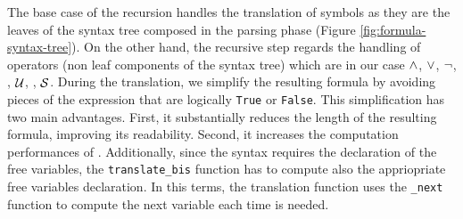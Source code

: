 The base case of the recursion handles the translation of symbols as they are the leaves of the syntax tree composed in the parsing phase (Figure \ref{fig:formula-syntax-tree}). On the other hand, the recursive step regards the handling of operators (non leaf components of the syntax tree) which are in our case $\wedge$, $\vee$, $\lnot$, \Next, $\mathop{\mathcal{U}}$, \Yesterday, $\mathop{\mathcal{S}}$. During the translation, we simplify the resulting formula by avoiding pieces of the expression that are logically \texttt{True} or \texttt{False}. This simplification has two main advantages. First, it substantially reduces the length of the resulting formula, improving its readability. Second, it increases the computation performances of \MONA.
Additionally, since the \MONA syntax requires the declaration of the free variables, the \texttt{translate\_bis} function has to compute also the appriopriate free variables declaration. In this terms, the translation function uses the \texttt{\_next} function to compute the next variable each time is needed.

